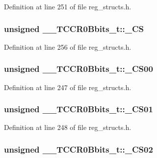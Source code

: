 Definition at line 251 of file reg\+\_\+structs.\+h.

\hypertarget{union_____t_c_c_r0_bbits__t_ab21c04125966534d7939628a9077208d}{
\subsubsection[{\+\_\+\+C\+S}]{\setlength{\rightskip}{0pt plus 5cm}unsigned \+\_\+\+\_\+\+T\+C\+C\+R0\+Bbits\+\_\+t\+::\+\_\+\+C\+S}}\label{union_____t_c_c_r0_bbits__t_ab21c04125966534d7939628a9077208d}


Definition at line 256 of file reg\+\_\+structs.\+h.

\hypertarget{union_____t_c_c_r0_bbits__t_a8d43b2f332244505a61be10fd377fb89}{
\subsubsection[{\+\_\+\+C\+S00}]{\setlength{\rightskip}{0pt plus 5cm}unsigned \+\_\+\+\_\+\+T\+C\+C\+R0\+Bbits\+\_\+t\+::\+\_\+\+C\+S00}}\label{union_____t_c_c_r0_bbits__t_a8d43b2f332244505a61be10fd377fb89}


Definition at line 247 of file reg\+\_\+structs.\+h.

\hypertarget{union_____t_c_c_r0_bbits__t_aa0e694c24a25f7ea20a7da739db12e1c}{
\subsubsection[{\+\_\+\+C\+S01}]{\setlength{\rightskip}{0pt plus 5cm}unsigned \+\_\+\+\_\+\+T\+C\+C\+R0\+Bbits\+\_\+t\+::\+\_\+\+C\+S01}}\label{union_____t_c_c_r0_bbits__t_aa0e694c24a25f7ea20a7da739db12e1c}


Definition at line 248 of file reg\+\_\+structs.\+h.

\hypertarget{union_____t_c_c_r0_bbits__t_a9f69a44610a069486fcef8ae3e25079d}{
\subsubsection[{\+\_\+\+C\+S02}]{\setlength{\rightskip}{0pt plus 5cm}unsigned \+\_\+\+\_\+\+T\+C\+C\+R0\+Bbits\+\_\+t\+::\+\_\+\+C\+S02}}\label{union_____t_c_c_r0_bbits__t_a9f69a44610a069486fcef8ae3e25079d}


